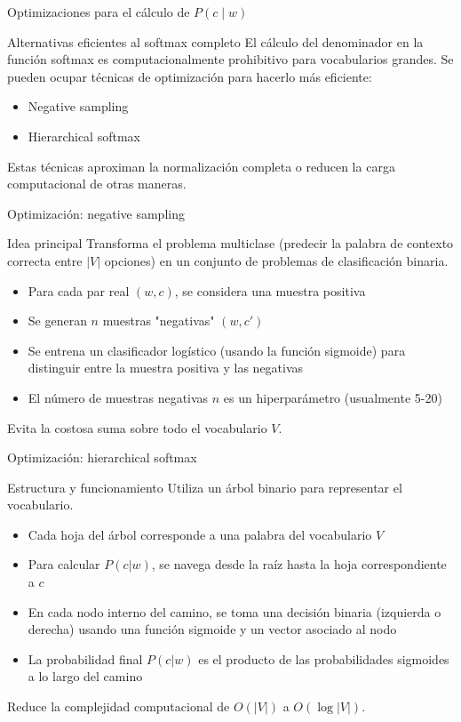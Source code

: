 \documentclass[handout]{beamer}
\begin{document}
\begin{frame}{Optimizaciones para el cálculo de $P(c\mid w)$}
  \begin{block}{Alternativas eficientes al softmax completo}
    El cálculo del denominador en la función softmax es computacionalmente prohibitivo para vocabularios grandes. Se pueden ocupar técnicas de optimización para hacerlo más eficiente:
    \begin{itemize}
        \item Negative sampling
        \item Hierarchical softmax
    \end{itemize}
    Estas técnicas aproximan la normalización completa o reducen la carga computacional de otras maneras.
  \end{block}
\end{frame}

\begin{frame}{Optimización: negative sampling}
  \begin{block}{Idea principal}
    Transforma el problema multiclase (predecir la palabra de contexto correcta entre $|V|$ opciones) en un conjunto de problemas de clasificación binaria.
    \begin{itemize}
        \item Para cada par real $(w, c)$, se considera una muestra positiva
        \item Se generan $n$ muestras "negativas" $(w, c')$
        \item Se entrena un clasificador logístico (usando la función sigmoide) para distinguir entre la muestra positiva y las negativas
        \item El número de muestras negativas $n$ es un hiperparámetro (usualmente 5-20)
    \end{itemize}
    Evita la costosa suma sobre todo el vocabulario $V$.
  \end{block}
\end{frame}

\begin{frame}{Optimización: hierarchical softmax}
  \begin{block}{Estructura y funcionamiento}
    Utiliza un árbol binario para representar el vocabulario.
    \begin{itemize}
        \item Cada hoja del árbol corresponde a una palabra del vocabulario $V$
        \item Para calcular $P(c|w)$, se navega desde la raíz hasta la hoja correspondiente a $c$
        \item En cada nodo interno del camino, se toma una decisión binaria (izquierda o derecha) usando una función sigmoide y un vector asociado al nodo
        \item La probabilidad final $P(c|w)$ es el producto de las probabilidades sigmoides a lo largo del camino
    \end{itemize}
    Reduce la complejidad computacional de $O(|V|)$ a $O(\log |V|)$.
  \end{block}
\end{frame}
\end{document}
